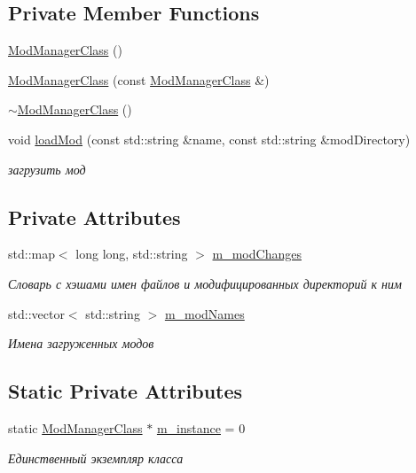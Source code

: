 \subsection*{Private Member Functions}
\begin{DoxyCompactItemize}
\item 
\hyperlink{class_mod_manager_class_a7f7c1ed45ae5447d499c844c5b289d84}{Mod\+Manager\+Class} ()
\item 
\hyperlink{class_mod_manager_class_ade3aab3de02372cac9b3c2a646cd2a95}{Mod\+Manager\+Class} (const \hyperlink{class_mod_manager_class}{Mod\+Manager\+Class} \&)
\item 
\hyperlink{class_mod_manager_class_a17847f68d95206b377d62f4908a6a2c0}{$\sim$\+Mod\+Manager\+Class} ()
\item 
void \hyperlink{class_mod_manager_class_a70d35681d5471c6157c079cb45689688}{load\+Mod} (const std\+::string \&name, const std\+::string \&mod\+Directory)
\begin{DoxyCompactList}\small\item\em загрузить мод \end{DoxyCompactList}\end{DoxyCompactItemize}
\subsection*{Private Attributes}
\begin{DoxyCompactItemize}
\item 
std\+::map$<$ long long, std\+::string $>$ \hyperlink{class_mod_manager_class_aaa66c302164a817e73152e0f12c9a8bc}{m\+\_\+mod\+Changes}
\begin{DoxyCompactList}\small\item\em Словарь с хэшами имен файлов и модифицированных директорий к ним \end{DoxyCompactList}\item 
std\+::vector$<$ std\+::string $>$ \hyperlink{class_mod_manager_class_a7ddb5edbeb6a3b3caec4300e80c84d12}{m\+\_\+mod\+Names}
\begin{DoxyCompactList}\small\item\em Имена загруженных модов \end{DoxyCompactList}\end{DoxyCompactItemize}
\subsection*{Static Private Attributes}
\begin{DoxyCompactItemize}
\item 
static \hyperlink{class_mod_manager_class}{Mod\+Manager\+Class} $\ast$ \hyperlink{class_mod_manager_class_a49d91418de2d61924f97b33c3199eaaa}{m\+\_\+instance} = 0
\begin{DoxyCompactList}\small\item\em Единственный экземпляр класса \end{DoxyCompactList}\end{DoxyCompactItemize}



